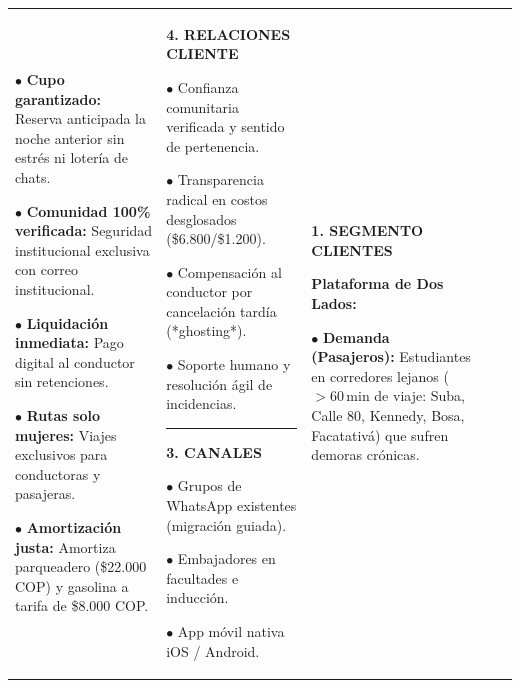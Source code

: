 \documentclass[11pt,a4paper]{article}
\begin{document}
\begin{table}[h!]
\begin{tabularx}{\textwidth}{|*{5}{>{\raggedright\arraybackslash}X|}}
$\bullet$ \textbf{Cupo garantizado:} Reserva anticipada la noche anterior sin estr\'es ni loter\'ia de chats.\par\vspace{2pt}
$\bullet$ \textbf{Comunidad 100\% verificada:} Seguridad institucional exclusiva con correo institucional.\par\vspace{2pt}
$\bullet$ \textbf{Liquidaci\'on inmediata:} Pago digital al conductor sin retenciones.\par\vspace{2pt}
$\bullet$ \textbf{Rutas solo mujeres:} Viajes exclusivos para conductoras y pasajeras.\par\vspace{2pt}
$\bullet$ \textbf{Amortizaci\'on justa:} Amortiza parqueadero (\$22.000 COP) y gasolina a tarifa de \$8.000 COP. &
\textbf{\color{primary}4. RELACIONES CLIENTE}\par\vspace{3pt}
$\bullet$ Confianza comunitaria verificada y sentido de pertenencia.\par\vspace{2pt}
$\bullet$ Transparencia radical en costos desglosados (\$6.800/\$1.200).\par\vspace{2pt}
$\bullet$ Compensaci\'on al conductor por cancelaci\'on tard\'ia (*ghosting*).\par\vspace{2pt}
$\bullet$ Soporte humano y resoluci\'on \'agil de incidencias.\par
\vspace{5pt}\hrule\vspace{5pt}
\textbf{\color{primary}3. CANALES}\par\vspace{3pt}
$\bullet$ Grupos de WhatsApp existentes (migraci\'on guiada).\par\vspace{2pt}
$\bullet$ Embajadores en facultades e inducci\'on.\par\vspace{2pt}
$\bullet$ App m\'ovil nativa iOS / Android. &
\textbf{\color{primary}1. SEGMENTO CLIENTES}\par\vspace{3pt}
\textbf{Plataforma de Dos Lados:}\par\vspace{2pt}
$\bullet$ \textbf{Demanda (Pasajeros):} Estudiantes en corredores lejanos ($>60$\,min de viaje: Suba, Calle 80, Kennedy, Bosa, Facatativ\'a) que sufren demoras cr\'onicas.\par\vspace{2pt}

\end{tabularx}
\end{table}
\end{document}

